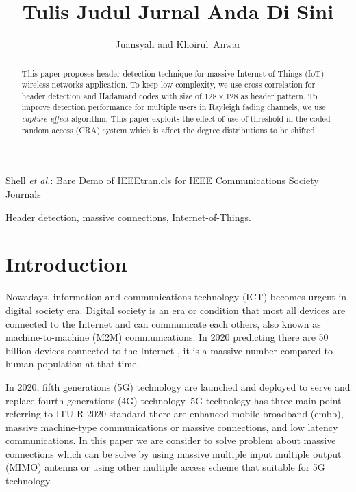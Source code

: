 \documentclass[journal,comsoc]{IEEEtran}
\begin{document}
\title{Tulis Judul Jurnal Anda Di Sini}

\author{Juansyah and Khoirul~Anwar}
{Shell \MakeLowercase{\textit{et al.}}: Bare Demo of IEEEtran.cls for IEEE Communications Society Journals}

\maketitle

\begin{abstract}
This paper proposes header detection technique for massive Internet-of-Things (IoT) wireless networks application. To keep low complexity, we use cross correlation for header detection and Hadamard codes with size of $128\times 128$ as header pattern. To improve detection performance for multiple users in Rayleigh fading channels, we use \textit{capture effect} algorithm. This paper exploits the effect of use of threshold in the coded random access (CRA) system which is affect the degree distributions to be shifted.
\end{abstract}
\begin{IEEEkeywords}
Header detection, massive connections, Internet-of-Things.
\end{IEEEkeywords}

\IEEEpeerreviewmaketitle

\section{Introduction}
Nowadays, information and communications technology (ICT) becomes urgent in digital society era. Digital society is an era or condition that most all devices are connected to the Internet and can communicate each others, also known as machine-to-machine (M2M) communications. In 2020 predicting there are 50 billion devices connected to the Internet \cite{Ericsson}, it is a massive number compared to human population at that time. 

In 2020, fifth generations (5G) technology are launched and deployed to serve and replace fourth generations (4G) technology. 5G technology has three main point referring to ITU-R 2020 standard there are enhanced mobile broadband (embb), massive machine-type communications or massive connections, and low latency communications. In this paper we are consider to solve problem about massive connections which can be solve by using massive multiple input multiple output (MIMO) antenna or using other multiple access scheme that suitable for 5G technology.
\end{document}
